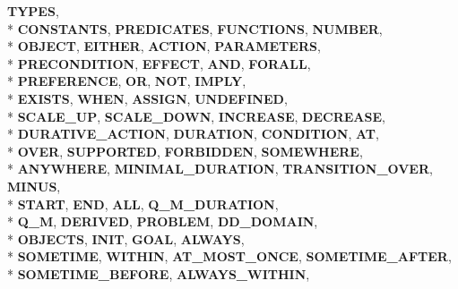 \begin{DoxyCompactItemize}
{{\bfseries T\+Y\+P\+E\+S}, 
\\*
{\bfseries C\+O\+N\+S\+T\+A\+N\+T\+S}, 
{\bfseries P\+R\+E\+D\+I\+C\+A\+T\+E\+S}, 
{\bfseries F\+U\+N\+C\+T\+I\+O\+N\+S}, 
{\bfseries N\+U\+M\+B\+E\+R}, 
\\*
{\bfseries O\+B\+J\+E\+C\+T}, 
{\bfseries E\+I\+T\+H\+E\+R}, 
{\bfseries A\+C\+T\+I\+O\+N}, 
{\bfseries P\+A\+R\+A\+M\+E\+T\+E\+R\+S}, 
\\*
{\bfseries P\+R\+E\+C\+O\+N\+D\+I\+T\+I\+O\+N}, 
{\bfseries E\+F\+F\+E\+C\+T}, 
{\bfseries A\+N\+D}, 
{\bfseries F\+O\+R\+A\+L\+L}, 
\\*
{\bfseries P\+R\+E\+F\+E\+R\+E\+N\+C\+E}, 
{\bfseries O\+R}, 
{\bfseries N\+O\+T}, 
{\bfseries I\+M\+P\+L\+Y}, 
\\*
{\bfseries E\+X\+I\+S\+T\+S}, 
{\bfseries W\+H\+E\+N}, 
{\bfseries A\+S\+S\+I\+G\+N}, 
{\bfseries U\+N\+D\+E\+F\+I\+N\+E\+D}, 
\\*
{\bfseries S\+C\+A\+L\+E\+\_\+\+U\+P}, 
{\bfseries S\+C\+A\+L\+E\+\_\+\+D\+O\+W\+N}, 
{\bfseries I\+N\+C\+R\+E\+A\+S\+E}, 
{\bfseries D\+E\+C\+R\+E\+A\+S\+E}, 
\\*
{\bfseries D\+U\+R\+A\+T\+I\+V\+E\+\_\+\+A\+C\+T\+I\+O\+N}, 
{\bfseries D\+U\+R\+A\+T\+I\+O\+N}, 
{\bfseries C\+O\+N\+D\+I\+T\+I\+O\+N}, 
{\bfseries A\+T}, 
\\*
{\bfseries O\+V\+E\+R}, 
{\bfseries S\+U\+P\+P\+O\+R\+T\+E\+D}, 
{\bfseries F\+O\+R\+B\+I\+D\+D\+E\+N}, 
{\bfseries S\+O\+M\+E\+W\+H\+E\+R\+E}, 
\\*
{\bfseries A\+N\+Y\+W\+H\+E\+R\+E}, 
{\bfseries M\+I\+N\+I\+M\+A\+L\+\_\+\+D\+U\+R\+A\+T\+I\+O\+N}, 
{\bfseries T\+R\+A\+N\+S\+I\+T\+I\+O\+N\+\_\+\+O\+V\+E\+R}, 
{\bfseries M\+I\+N\+U\+S}, 
\\*
{\bfseries S\+T\+A\+R\+T}, 
{\bfseries E\+N\+D}, 
{\bfseries A\+L\+L}, 
{\bfseries Q\+\_\+\+M\+\_\+\+D\+U\+R\+A\+T\+I\+O\+N}, 
\\*
{\bfseries Q\+\_\+\+M}, 
{\bfseries D\+E\+R\+I\+V\+E\+D}, 
{\bfseries P\+R\+O\+B\+L\+E\+M}, 
{\bfseries D\+D\+\_\+\+D\+O\+M\+A\+I\+N}, 
\\*
{\bfseries O\+B\+J\+E\+C\+T\+S}, 
{\bfseries I\+N\+I\+T}, 
{\bfseries G\+O\+A\+L}, 
{\bfseries A\+L\+W\+A\+Y\+S}, 
\\*
{\bfseries S\+O\+M\+E\+T\+I\+M\+E}, 
{\bfseries W\+I\+T\+H\+I\+N}, 
{\bfseries A\+T\+\_\+\+M\+O\+S\+T\+\_\+\+O\+N\+C\+E}, 
{\bfseries S\+O\+M\+E\+T\+I\+M\+E\+\_\+\+A\+F\+T\+E\+R}, 
\\*
{\bfseries S\+O\+M\+E\+T\+I\+M\+E\+\_\+\+B\+E\+F\+O\+R\+E}, 
{\bfseries A\+L\+W\+A\+Y\+S\+\_\+\+W\+I\+T\+H\+I\+N}, 
}
\end{DoxyCompactItemize}
